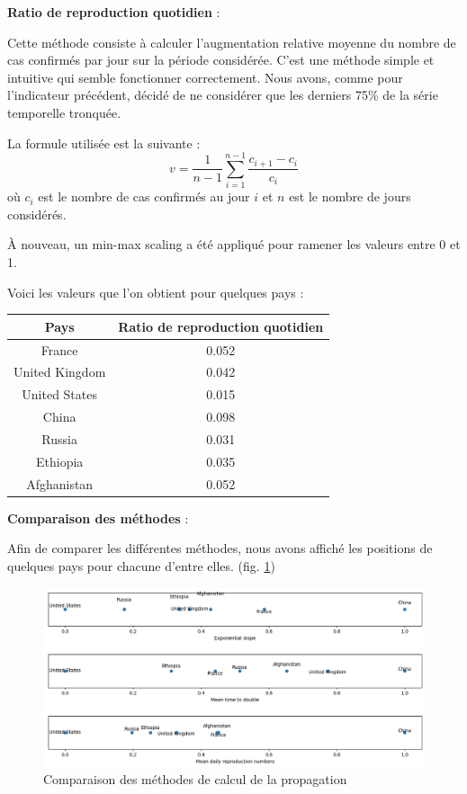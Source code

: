 \documentclass[12pt]{iEEEtran}
\begin{document}
\noindent\textbf{Ratio de reproduction quotidien} :

Cette méthode consiste à calculer l'augmentation relative moyenne du nombre de cas confirmés par jour
sur la période considérée. C'est une méthode simple et intuitive qui semble fonctionner correctement.
Nous avons, comme pour l'indicateur précédent, décidé de ne considérer que les derniers 75\% de la série
temporelle tronquée.

La formule utilisée est la suivante :
$$v = \frac{1}{n-1} \sum_{i=1}^{n-1} \frac{c_{i+1} - c_i}{c_i}$$ où $c_i$ est le nombre de cas confirmés
au jour $i$ et $n$ est le nombre de jours considérés.

À nouveau, un min-max scaling a été appliqué pour ramener les valeurs entre 0 et 1.

Voici les valeurs que l'on obtient pour quelques pays :
\begin{table}[h]
    \centering
    \begin{tabular}{|c|c|}
        \hline
        Pays & Ratio de reproduction quotidien \\
        \hline
        France & 0.052 \\
        United Kingdom & 0.042 \\
        United States & 0.015 \\
        China & 0.098 \\
        Russia & 0.031 \\
        Ethiopia & 0.035 \\
        Afghanistan & 0.052 \\
        \hline
    \end{tabular}
\end{table}

\newpage

\noindent\textbf{Comparaison des méthodes} :

Afin de comparer les différentes méthodes, nous avons affiché les positions de quelques
pays pour chacune d'entre elles. (fig. \ref{fig:spread_comp})

\begin{figure}[h]
    \centering
    \includegraphics[width=\columnwidth]{img/spread_comp.png}
    \caption{Comparaison des méthodes de calcul de la propagation}

    \label{fig:spread_comp}
\end{figure}
\end{document}
